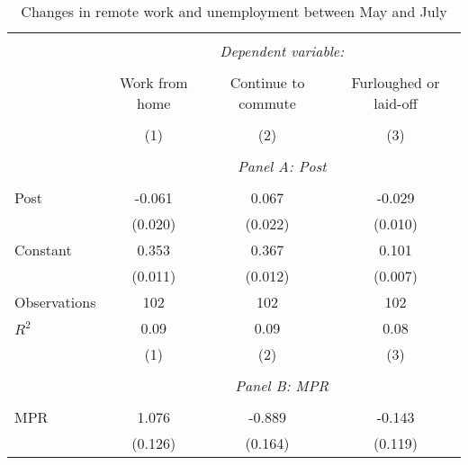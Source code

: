 \begin{table}[!htbp] \centering                    \caption{Changes in remote work and unemployment between May and July}                    \label{tab:changes}                  \small                  \begin{tabular}{@{\extracolsep{5pt}}lccc}                  \\[-1.8ex]\hline                  \hline \\[-1.8ex]                   & \multicolumn{3}{c}{\textit{Dependent variable:}} \\                   \cline{2-4}                   \\[-1.8ex] & Work from home & Continue to commute & Furloughed or laid-off \\                   \hline \\[-1.8ex]               
                    &\multicolumn{1}{c}{(1)}         &\multicolumn{1}{c}{(2)}         &\multicolumn{1}{c}{(3)}         \\
\hline \\               & \multicolumn{3}{c}{\textit{Panel A: Post}} \\               \addlinespace[1mm] \\
Post                &      -0.061\sym{***}&       0.067\sym{***}&      -0.029\sym{***}\\
                    &     (0.020)         &     (0.022)         &     (0.010)         \\
[1em]
Constant            &       0.353\sym{***}&       0.367\sym{***}&       0.101\sym{***}\\
                    &     (0.011)         &     (0.012)         &     (0.007)         \\
[1em]
Observations        &         102         &         102         &         102         \\
\(R^{2}\)           &        0.09         &        0.09         &        0.08         \\
                    &\multicolumn{1}{c}{(1)}         &\multicolumn{1}{c}{(2)}         &\multicolumn{1}{c}{(3)}         \\
\hline \\               & \multicolumn{3}{c}{\textit{Panel B: MPR}} \\               \addlinespace[1mm] \\
MPR         &       1.076\sym{***}&      -0.889\sym{***}&      -0.143         \\
&     (0.126)         &     (0.164)         &     (0.119)         \\

\end{tabular}
\end{table}
